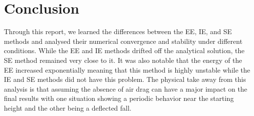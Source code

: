 \section{Conclusion}

Through this report, we learned the differences between the EE, IE, and SE methods and analysed their numerical convergence and stability under different conditions. While the EE and IE methods drifted off the analytical solution, the SE method remained very close to it. It was also notable that the energy of the EE increased exponentially meaning that this method is highly unstable while the IE and SE methods did not have this problem. The physical take away from this analysis is that assuming the absence of air drag can have a major impact on the final results with one situation showing a periodic behavior near the starting height and the other being a deflected fall. 

